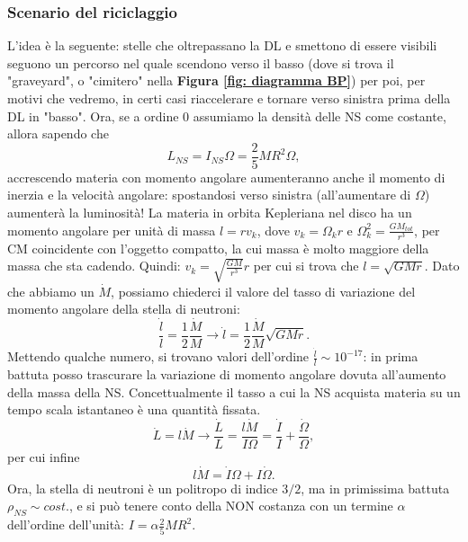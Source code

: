 \subsubsection{Scenario del riciclaggio}
L'idea è la seguente: stelle che oltrepassano la DL e smettono di essere visibili seguono un percorso nel quale scendono verso il basso (dove si trova il "graveyard", o "cimitero" nella \textbf{Figura \ref{fig: diagramma BP}}) per poi, per motivi che vedremo, in certi casi riaccelerare e tornare verso sinistra prima della DL in "basso".
Ora, se a ordine 0 assumiamo la densità delle NS come costante, allora sapendo che
\begin{equation}
    L_{NS} = I_{NS}\Omega = \frac{2}{5}MR^2\Omega,
\end{equation}
accrescendo materia con momento angolare aumenteranno anche il momento di inerzia e la velocità angolare: spostandosi verso sinistra (all'aumentare di $\Omega$) aumenterà la luminosità!
La materia in orbita Kepleriana nel disco ha un momento angolare per unità di massa $l=rv_k$, dove $v_k = \Omega_kr $ e $\Omega_k^2 = \frac{GM_{tot}}{r^3} $, per CM coincidente con l'oggetto compatto, la cui massa è molto maggiore della massa che sta cadendo.
Quindi: $v_k=\sqrt{\frac{GM}{r^3}}r $ per cui si trova che $l=\sqrt{GMr}$.
Dato che abbiamo un $\dot{M}$, possiamo chiederci il valore del tasso di variazione del momento angolare della stella di neutroni:
\begin{equation}
    \frac{\dot{l}}{l} = \frac{1}{2}\frac{\dot{M}}{M} \xrightarrow{} \dot{l} = \frac{1}{2}\frac{\dot{M}}{M}\sqrt{GMr}.
\end{equation}
Mettendo qualche numero, si trovano valori dell'ordine $\frac{\dot{l}}{l}\sim 10^{-17}$: in prima battuta posso trascurare la variazione di momento angolare dovuta all'aumento della massa della NS.
Concettualmente il tasso a cui la NS acquista materia su un tempo scala istantaneo è una quantità fissata.
\begin{equation}
    \dot{L}=l\dot{M}\xrightarrow{} \frac{\dot{L}}{L} = \frac{l\dot{M}}{I\Omega} = \frac{\dot{I}}{I} + \frac{\dot{\Omega}}{\Omega},
\end{equation}
per cui infine 
\begin{equation}
     l\dot{M} = \dot{I}\Omega + I \dot{\Omega} .
    \label{eq: l Mdot}
\end{equation}
Ora, la stella di neutroni è un politropo di indice $3/2$, ma in primissima battuta $\rho_{NS}\sim cost.$, e si può tenere conto della NON costanza con un termine $\alpha$ dell'ordine dell'unità: $I = \alpha \frac{2}{5}MR^2$.
